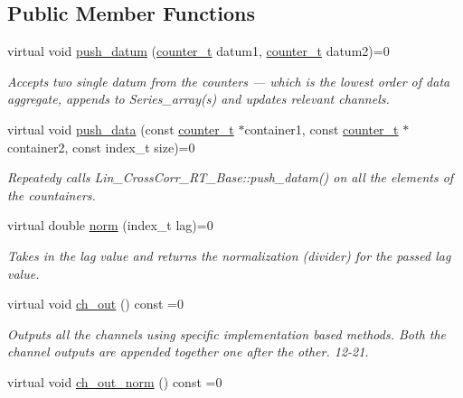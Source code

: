 \subsection*{Public Member Functions}
\begin{DoxyCompactItemize}
\item 
virtual void \hyperlink{classLin__CrossCorr__RT__Base_abdc90b5ab6a5f7ac98e97b3d16261834}{push\+\_\+datum} (\hyperlink{types_8hpp_a22f279793847eba127de149437848c48}{counter\+\_\+t} datum1, \hyperlink{types_8hpp_a22f279793847eba127de149437848c48}{counter\+\_\+t} datum2)=0
\begin{DoxyCompactList}\small\item\em Accepts two single {\ttfamily datum} from the counters — which is the lowest order of data aggregate, appends to Series\+\_\+array(s) and updates relevant channels. \end{DoxyCompactList}\item 
virtual void \hyperlink{classLin__CrossCorr__RT__Base_a48faa93c6766605436fd8399949beb11}{push\+\_\+data} (const \hyperlink{types_8hpp_a22f279793847eba127de149437848c48}{counter\+\_\+t} $\ast$container1, const \hyperlink{types_8hpp_a22f279793847eba127de149437848c48}{counter\+\_\+t} $\ast$container2, const index\+\_\+t size)=0
\begin{DoxyCompactList}\small\item\em Repeatedy calls {\ttfamily Lin\+\_\+\+Cross\+Corr\+\_\+\+R\+T\+\_\+\+Base\+::push\+\_\+datam()} on all the elements of the countainers. \end{DoxyCompactList}\item 
virtual double \hyperlink{classLin__CrossCorr__RT__Base_a43779bc7fd546fa8f73713de4bd6e285}{norm} (index\+\_\+t lag)=0
\begin{DoxyCompactList}\small\item\em Takes in the lag value and returns the normalization (divider) for the passed lag value. \end{DoxyCompactList}\item 
virtual void \hyperlink{group__Lin__CorrCorr__Base__Out_ga5d7bad992e07606a18ea828aeb768e1f}{ch\+\_\+out} () const =0
\begin{DoxyCompactList}\small\item\em Outputs all the channels using specific implementation based methods. Both the channel outputs are appended together one after the other. 12-\/21. \end{DoxyCompactList}\item 
virtual void \hyperlink{group__Lin__CorrCorr__Base__Out_gaaac0e6901df27096d687c228638c012b}{ch\+\_\+out\+\_\+norm} () const =0

\end{DoxyCompactItemize}
